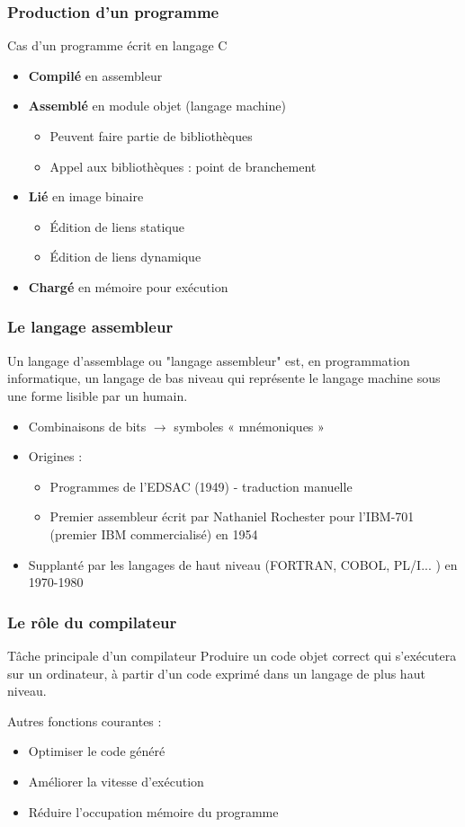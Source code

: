 \begin{frame}
\frametitle{Production d'un programme}
Cas d'un programme écrit en langage C
\begin{itemize}
\item \textbf{Compilé} en assembleur
\item \textbf{Assemblé} en module objet (langage machine)
\begin{itemize}
\item Peuvent faire partie de bibliothèques
\item Appel aux bibliothèques : point de branchement
\end{itemize}
\item \textbf{Lié} en image binaire
\begin{itemize}
\item Édition de liens statique
\item Édition de liens dynamique
\end{itemize}
\item \textbf{Chargé} en mémoire pour exécution
\end{itemize}
\end{frame}

\begin{frame}
\frametitle{Le langage assembleur \cite{wp-assembleur}}
\begin{definition}
Un langage d'assemblage ou "langage assembleur" est, en programmation informatique, un langage de bas niveau qui représente le langage machine sous une forme lisible par un humain.
\end{definition}
\begin{itemize}
\item Combinaisons de bits $\rightarrow$ symboles « mnémoniques »
\item Origines : \begin{itemize}
\item Programmes de l'EDSAC (1949) - traduction manuelle
\item Premier assembleur écrit par Nathaniel Rochester pour l'IBM-701 (premier IBM commercialisé) en 1954
\end{itemize}
\item Supplanté par les langages de haut niveau (FORTRAN, COBOL, PL/I... ) en 1970-1980
\end{itemize}

\end{frame}

\begin{frame}
\frametitle{Le rôle du compilateur}
\begin{block}{Tâche principale d'un compilateur}
Produire un code objet correct qui s'exécutera sur un ordinateur, à partir d'un code exprimé dans un langage de plus haut niveau.
\end{block}
Autres fonctions courantes :
\begin{itemize}
\item Optimiser le code généré
\item Améliorer la vitesse d'exécution
\item Réduire l'occupation mémoire du programme
\end{itemize}
\end{frame}

